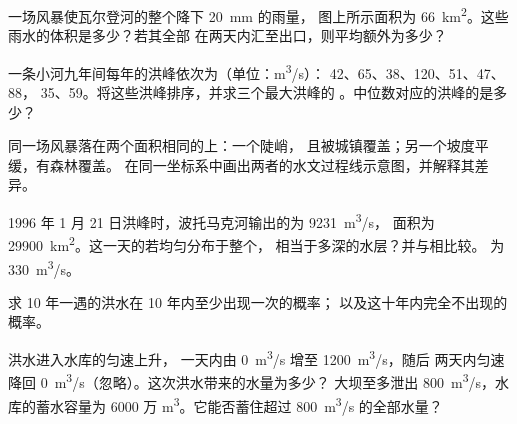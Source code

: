 \begin{exercise}[$\star\star$]\label{exo:g10:drainage-basins:7}
一场风暴使瓦尔登河的整个降下 \qty{20}{mm} 的雨量，
图上所示面积为 \qty{66}{km^2}。这些雨水的体积是多少？若其全部
在两天内汇至出口，则平均额外为多少？
\end{exercise}

\begin{exercise}[$\star\star$]\label{exo:g10:drainage-basins:8}
一条小河九年间每年的洪峰依次为（单位：\unit{m^3/s}）：
\num{42}、\num{65}、\num{38}、\num{120}、\num{51}、\num{47}、\num{88}，
\num{35}、\num{59}。将这些洪峰排序，并求三个最大洪峰的
。中位数对应的洪峰的是多少？
\end{exercise}

\begin{exercise}[$\star\star$]\label{exo:g10:drainage-basins:9}
同一场风暴落在两个面积相同的上：一个陡峭，
且被城镇覆盖；另一个坡度平缓，有森林覆盖。
在同一坐标系中画出两者的水文过程线示意图，并解释其差异。
\end{exercise}

\begin{exercise}[$\star\star$]\label{exo:g10:drainage-basins:10}
1996 年 1 月 21 日洪峰时，波托马克河输出的为 \qty{9231}{m^3/s}，
面积为 \qty{29900}{km^2}。这一天的若均匀分布于整个，
相当于多深的水层？并与相比较。
为 \qty{330}{m^3/s}。
\end{exercise}

\begin{exercise}[$\star\star$]\label{exo:g10:drainage-basins:11}
求 \num{10} 年一遇的洪水在 \num{10} 年内至少出现一次的概率；
以及这十年内完全不出现的概率。
\end{exercise}

\begin{exercise}[$\star\star\star$]\label{exo:g10:drainage-basins:12}
洪水进入水库的匀速上升，
一天内由 \qty{0}{m^3/s} 增至 \qty{1200}{m^3/s}，随后
两天内匀速降回 \qty{0}{m^3/s}（忽略）。这次洪水带来的水量为多少？
大坝至多泄出 \qty{800}{m^3/s}，水库的蓄水容量为
6000 万 \unit{m^3}。它能否蓄住超过
\qty{800}{m^3/s} 的全部水量？
\end{exercise}

